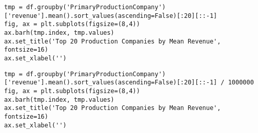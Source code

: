 \begin{lstlisting}
tmp = df.groupby('PrimaryProductionCompany')['revenue'].mean().sort_values(ascending=False)[:20][::-1]
fig, ax = plt.subplots(figsize=(8,4))
ax.barh(tmp.index, tmp.values)
ax.set_title('Top 20 Production Companies by Mean Revenue', fontsize=16)
ax.set_xlabel('')
\end{lstlisting}

\begin{lstlisting}
tmp = df.groupby('PrimaryProductionCompany')['revenue'].mean().sort_values(ascending=False)[:20][::-1] / 1000000
fig, ax = plt.subplots(figsize=(8,4))
ax.barh(tmp.index, tmp.values)
ax.set_title('Top 20 Production Companies by Mean Revenue', fontsize=16)
ax.set_xlabel('')
\end{lstlisting}

